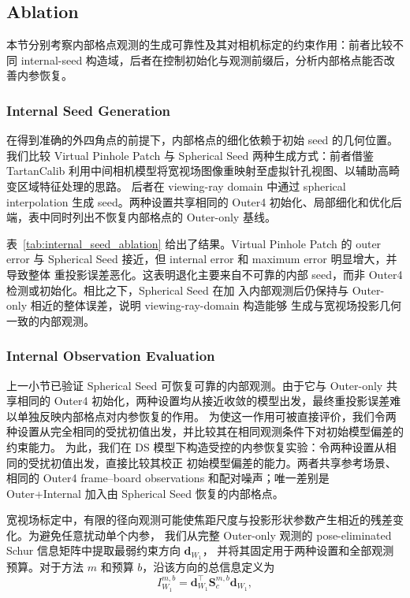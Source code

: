 \documentclass[letterpaper, 10 pt, conference]{ieeeconf}  %
\begin{document}
\subsection{Ablation}
本节分别考察内部格点观测的生成可靠性及其对相机标定的约束作用：前者比较不同 internal-seed 构造域，后者在控制初始化与观测前缀后，分析内部格点能否改善内参恢复。
\subsubsection{Internal Seed Generation}
在得到准确的外四角点的前提下，内部格点的细化依赖于初始 seed 的几何位置。我们比较 Virtual Pinhole Patch 与
Spherical Seed 两种生成方式：前者借鉴 TartanCalib 利用中间相机模型将宽视场图像重映射至虚拟针孔视图、以辅助高畸变区域特征处理的思路。
后者在 viewing-ray domain 中通过 spherical interpolation 生成 seed。两种设置共享相同的
Outer4 初始化、局部细化和优化后端，表中同时列出不恢复内部格点的 Outer-only 基线。

表~\ref{tab:internal_seed_ablation} 给出了结果。Virtual Pinhole Patch 的 outer error
与 Spherical Seed 接近，但 internal error 和 maximum error 明显增大，并导致整体
重投影误差恶化。这表明退化主要来自不可靠的内部 seed，而非 Outer4 检测或初始化。相比之下，Spherical Seed 在加
入内部观测后仍保持与 Outer-only 相近的整体误差，说明 viewing-ray-domain 构造能够
生成与宽视场投影几何一致的内部观测。

\subsubsection{Internal Observation Evaluation}
上一小节已验证 Spherical Seed 可恢复可靠的内部观测。由于它与 Outer-only 共享相同的 Outer4
初始化，两种设置均从接近收敛的模型出发，最终重投影误差难以单独反映内部格点对内参恢复的作用。
为使这一作用可被直接评价，我们令两种设置从完全相同的受扰初值出发，并比较其在相同观测条件下对初始模型偏差的约束能力。
为此，我们在 DS 模型下构造受控的内参恢复实验：令两种设置从相同的受扰初值出发，直接比较其校正
初始模型偏差的能力。两者共享参考场景、相同的 Outer4 frame--board observations 和配对噪声；唯一差别是
Outer+Internal 加入由 Spherical Seed 恢复的内部格点。

宽视场标定中，有限的径向观测可能使焦距尺度与投影形状参数产生相近的残差变化。为避免任意扰动单个内参，
我们从完整 Outer-only 观测的 pose-eliminated Schur 信息矩阵中提取最弱约束方向 $\mathbf d_{W_1}$，
并将其固定用于两种设置和全部观测预算。对于方法 $m$ 和预算 $b$，沿该方向的总信息定义为
\begin{equation}
I_{W_1}^{m,b}=
\mathbf d_{W_1}^{\top}\mathbf S_c^{m,b}\mathbf d_{W_1},
\end{equation}
\end{document}
